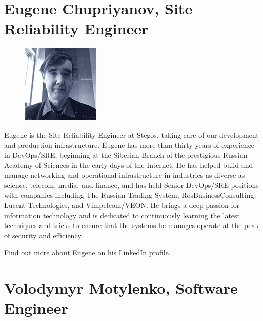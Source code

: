 \documentclass[8pt,fleqn,openany]{book}
\begin{document}
\section{Eugene Chupriyanov, Site Reliability Engineer}

{
\setlength\intextsep{0pt}
\begin{figure}
	\includegraphics{images/team/team-5.png}
\end{figure}

Eugene is the Site Reliability Engineer at Stegos, taking care of our development and production infrastructure. Eugene has more than thirty years of experience in DevOps/SRE, beginning at the Siberian Branch of the prestigious Russian Academy of Sciences in the early days of the Internet. He has helped build and manage networking and operational infrastructure in industries as diverse as science, telecom, media, and finance, and has held Senior DevOps/SRE positions with companies including The Russian Trading System, RosBusinessConsulting, Lucent Technologies, and Vimpelcom/VEON. He brings a deep passion for information technology and is dedicated to continuously learning the latest techniques and tricks to ensure that the systems he manages operate at the peak of security and efficiency. 

Find out more about Eugene on his \href{https://www.linkedin.com/in/eugenechupriyanov/}{LinkedIn profile}.
}

\section{Volodymyr Motylenko, Software Engineer}
\end{document}

